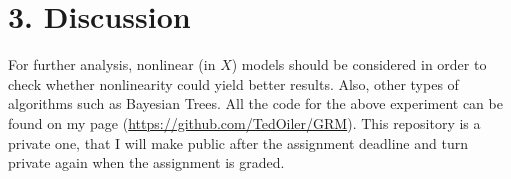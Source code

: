 \documentclass[fleqn, a4paper]{report}
\begin{document}
\section*{3. Discussion}

For further analysis, nonlinear (in $X$) models should be considered in order to check whether nonlinearity could yield better results. Also, other types of algorithms such as Bayesian Trees. All the code for the above experiment can be found on my \href{https://github.com/TedOiler/GRM}{\faGithub} page (\url{https://github.com/TedOiler/GRM}). This repository is a private one, that I will make public after the assignment deadline and turn private again when the assignment is graded.



\end{document}
